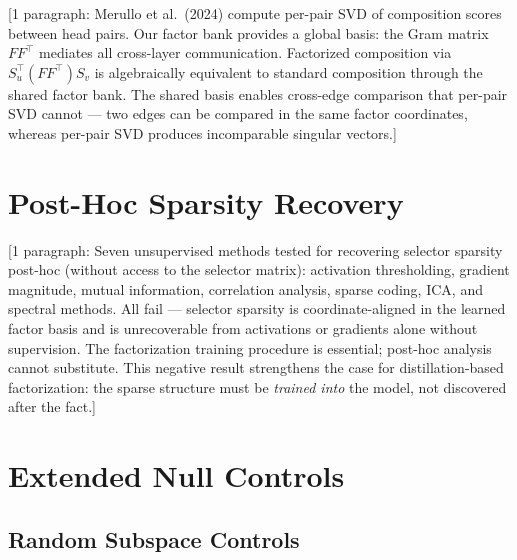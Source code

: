 \documentclass[11pt]{article}
\begin{document}

[1 paragraph: Merullo et al.\ (2024) compute per-pair SVD of composition
scores between head pairs. Our factor bank provides a global basis: the
Gram matrix $F F^\top$ mediates all cross-layer communication.
Factorized composition via $S_u^\top (F F^\top) S_v$ is algebraically
equivalent to standard composition through the shared factor bank. The
shared basis enables cross-edge comparison that per-pair SVD cannot ---
two edges can be compared in the same factor coordinates, whereas
per-pair SVD produces incomparable singular vectors.]



\section{Post-Hoc Sparsity Recovery}
\label{app:posthoc}


[1 paragraph: Seven unsupervised methods tested for recovering selector
sparsity post-hoc (without access to the selector matrix): activation
thresholding, gradient magnitude, mutual information, correlation
analysis, sparse coding, ICA, and spectral methods. All fail ---
selector sparsity is coordinate-aligned in the learned factor basis
and is unrecoverable from activations or gradients alone without
supervision. The factorization training procedure is essential;
post-hoc analysis cannot substitute. This negative result strengthens
the case for distillation-based factorization: the sparse structure
must be \emph{trained into} the model, not discovered after the fact.]



\section{Extended Null Controls}
\label{app:nullcontrols_extended}

\subsection{Random Subspace Controls}
\end{document}
